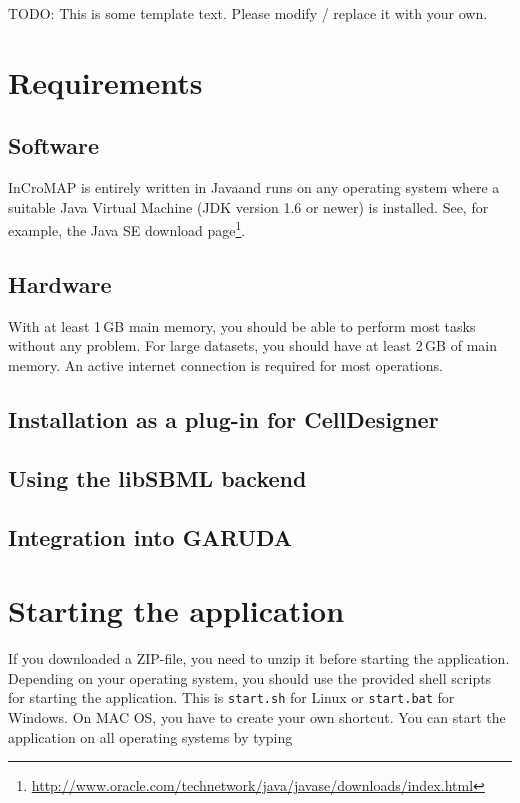 TODO: This is some template text. Please modify / replace it with your own.


\section{Requirements}
\subsection{Software}

InCroMAP is entirely written in Java\TTra and runs on any operating system
where a suitable Java Virtual Machine (JDK version 1.6 or newer) is installed.
See, for example, the Java SE download
page\footnote{\url{http://www.oracle.com/technetwork/java/javase/downloads/index.html}\label{fn:jvmldl}}.

\subsection{Hardware}

With at least 1\,GB main memory, you should be able to perform most tasks
without any problem. For large datasets, you should have at least 2\,GB of main
memory. \newline An active internet connection is required for most operations.

\subsection{Installation as a plug-in for CellDesigner}

\subsection{Using the libSBML backend}

\subsection{Integration into GARUDA}

\section{Starting the application}
\label{startingTheProgram}

If you downloaded a ZIP-file, you need to unzip it before starting the
application. Depending on your operating system, you should use the provided
shell scripts for starting the application. This is \texttt{start.sh} for Linux
or \texttt{start.bat} for Windows. On MAC OS, you have to create your own
shortcut. You can start the application on all operating systems by typing

